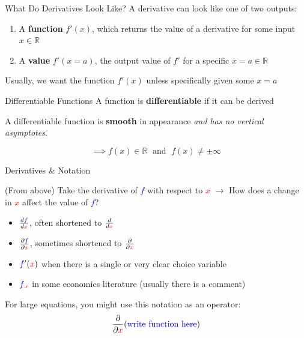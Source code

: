 \documentclass[10pt]{beamer}
\begin{document}
\begin{frame}{What Do Derivatives Look Like?}
    A derivative can look like one of two outputs:
\vspace{.3cm}
    \begin{enumerate}
        \item A \textbf{function} $f'(x)$, which returns the value of a derivative for some input $x \in \mathbb{R}$
        \item A \textbf{value} $f'(x=a)$, the output value of $f'$ for a specific $x = a \in \mathbb{R}$
    \end{enumerate} 
\vspace{.3cm}
    Usually, we want the function $f'(x)$ unless specifically given some $x=a$
\end{frame}

\begin{frame}{Differentiable Functions}
    A function is \textbf{differentiable} if it can be derived

    \vspace{.5cm}

    A differentiable function is \textbf{smooth} in appearance \textit{and has no vertical asymptotes}.

    \[\implies f(x) \in \mathbb{R} \; \text{ and } \; f(x) \neq \pm \infty\]
\end{frame}

\begin{frame}{Derivatives \& Notation}

(From above) Take the derivative of \textcolor{blue}{$f$} with respect to \textcolor{red}{$x$} $\rightarrow$ How does a change in \textcolor{red}{$x$} affect the value of \textcolor{blue}{$f$}?

\begin{itemize}
    \item $\frac{d\textcolor{blue}{f}}{d\textcolor{red}{x}}$, often shortened to $\frac{d}{d\textcolor{red}{x}}$
    \item $\frac{\partial \textcolor{blue}{f}}{\partial \textcolor{red}{x}}$, sometimes shortened to $\frac{\partial}{\partial\textcolor{red}{x}}$
    \item $\textcolor{blue}{f}'(\textcolor{red}{x})$ when there is a single or very clear choice variable
    \item $\textcolor{blue}{f}_{\textcolor{red}{x}}$ in some economics literature (usually there is a comment)
\end{itemize}

For large equations, you might use this notation as an operator: \[\frac{\partial}{\partial \textcolor{red}{x}}(\text{\textcolor{blue}{write function here}})\]
    
\end{frame}
\end{document}
